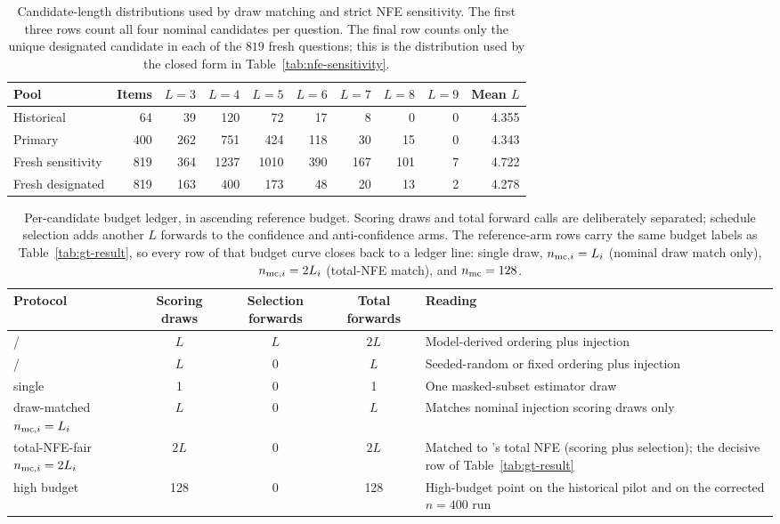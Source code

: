 \begin{table}[H]
\centering
\small
\setlength{\tabcolsep}{3pt}
\caption{Candidate-length distributions used by draw matching and strict NFE
sensitivity.  The first three rows count all four nominal candidates per
question.  The final row counts only the unique designated candidate in each of
the $819$ fresh questions; this is the distribution used by the closed form in
Table~\ref{tab:nfe-sensitivity}.}
\label{tab:candidate-lengths}
\begin{tabular}{@{}lrrrrrrrrr@{}}
\toprule
Pool & Items & $L=3$ & $L=4$ & $L=5$ & $L=6$ & $L=7$ & $L=8$ & $L=9$ & Mean $L$ \\
\midrule
Historical & 64 & 39 & 120 & 72 & 17 & 8 & 0 & 0 & 4.355 \\
Primary & 400 & 262 & 751 & 424 & 118 & 30 & 15 & 0 & 4.343 \\
Fresh sensitivity & 819 & 364 & 1237 & 1010 & 390 & 167 & 101 & 7 & 4.722 \\
Fresh designated & 819 & 163 & 400 & 173 & 48 & 20 & 13 & 2 & 4.278 \\
\bottomrule
\end{tabular}
\end{table}

\begin{table}[H]
\centering
\small
\caption{Per-candidate budget ledger, in ascending reference budget.  Scoring
draws and total forward calls are deliberately separated; schedule selection
adds another $L$ forwards to the confidence and anti-confidence arms.  The
reference-arm rows carry the same budget labels as
Table~\ref{tab:gt-result}, so every row of that budget curve closes back to a
ledger line: single draw, $n_{{\rm mc},i}=L_i$ (nominal draw match only),
$n_{{\rm mc},i}=2L_i$ (total-NFE match), and $n_{\rm mc}=128$.}
\label{tab:compute-ledger}
\begin{tabularx}{\textwidth}{@{}P{0.19\textwidth}cccY@{}}
\toprule
Protocol & Scoring draws & Selection forwards & Total forwards & Reading \\
\midrule
\sconf{} / \ainj{} & $L$ & $L$ & $2L$ & Model-derived ordering plus injection \\
\rinj{} / \finj{} & $L$ & 0 & $L$ & Seeded-random or fixed ordering plus injection \\
\mcu{} single & 1 & 0 & 1 & One masked-subset estimator draw \\
\mcu{} draw-matched $n_{{\rm mc},i}=L_i$ & $L$ & 0 & $L$ & Matches nominal
injection scoring draws only \\
\mcu{} total-NFE-fair $n_{{\rm mc},i}=2L_i$ & $2L$ & 0 & $2L$ & Matched to
\sconf{}'s total NFE (scoring plus selection); the decisive row of
Table~\ref{tab:gt-result} \\
\mcu{} high budget & 128 & 0 & 128 & High-budget point on the historical pilot
and on the corrected $n{=}400$ run \\
\bottomrule
\end{tabularx}
\end{table}

